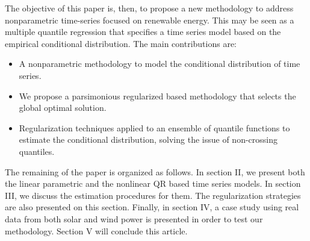  
The objective of this paper is, then, to propose a new methodology to address nonparametric time-series focused on renewable energy. This may be seen as a multiple quantile regression that specifies a time series model based on the empirical conditional distribution. The main contributions are:
\begin{itemize}
	\item A nonparametric methodology to model the conditional distribution of time series.
	
	\item We propose a parsimonious regularized based methodology that selects the global optimal solution.
	
	\item Regularization techniques applied to an ensemble of quantile functions to estimate the conditional distribution, solving the issue of non-crossing quantiles.
	
	
\end{itemize}






The remaining of the paper is organized as follows. In section II, we present both the linear parametric and the nonlinear QR based time series models. In section III, we discuss the estimation procedures for them. The regularization strategies are also presented on this section. Finally, in section IV, a case study using real data from both solar and wind power is presented in order to test our methodology. Section V will conclude this article.





